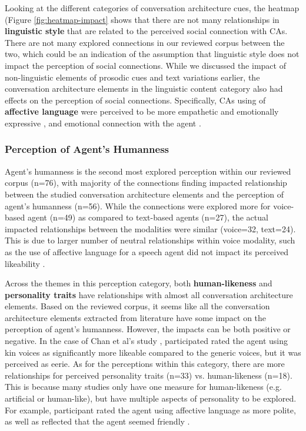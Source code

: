 \documentclass[sigconf,screen,review, anonymous]{acmart}
\newcommand{\cmt}[1]{}%
\begin{document}
Looking at the different categories of conversation architecture cues, the heatmap (Figure \ref{fig:heatmap-impact} shows that there are not many relationships in \textbf{linguistic style} that are related to the perceived social connection with CAs. There are not many explored connections in our reviewed corpus between the two, which could be an indication of the assumption that linguistic style does not impact the perception of social connections.
While we discussed the impact of non-linguistic elements of prosodic cues and text variations earlier, the conversation architecture elements in the linguistic content category also had effects on the perception of social connections. Specifically, CAs using of \textbf{affective language} were perceived to be more empathetic \cite{daher2020empathic}\cmt{[58]}\cite{diederich2019emulating}\cmt{[25]}\cite{yang2017perceived}\cmt{[44]} and emotionally expressive \cite{zhu2022effects}\cmt{[26]}, and emotional connection with the agent \cite{lee2019s}\cmt{[55]}\cite{lubis2019positive}\cmt{[43]}.


\subsubsection{Perception of Agent's Humanness}

Agent's humanness is the second most explored perception within our reviewed corpus (n=76), with majority of the connections finding impacted relationship between the studied conversation architecture elements and the perception of agent's humanness (n=56). While the connections were explored more for voice-based agent (n=49) as compared to text-based agents (n=27), the actual impacted relationships between the modalities were similar (voice=32, text=24). This is due to larger number of neutral relationships within voice modality, such as the use of affective language for a speech agent did not impact its perceived likeability \cite{hu2022polite}\cmt{[76]}.

Across the themes in this perception category, both \textbf{human-likeness} and \textbf{personality traits} have relationships with almost all conversation architecture elements. Based on the reviewed corpus, it seems like all the conversation architecture elements extracted from literature have some impact on the perception of agent's humanness. However, the impacts can be both positive or negative. In the case of Chan et al's study \cite{chan2021kinvoices}\cmt{[74]}, participated rated the agent using kin voices as significantly more likeable compared to the generic voices, but it was perceived as eerie. As for the perceptions within this category, there are more relationships for perceived personality traits (n=33) vs. human-likeness (n=18). This is because many studies only have one measure for human-likeness (e.g. artificial or human-like), but have multiple aspects of personality to be explored. For example, participant rated the agent using affective language as more polite, as well as reflected that the agent seemed friendly \cite{hu2022polite}\cmt{[76]}. 
\end{document}
